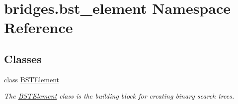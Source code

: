 \hypertarget{namespacebridges_1_1bst__element}{}\section{bridges.\+bst\+\_\+element Namespace Reference}
\label{namespacebridges_1_1bst__element}
\subsection*{Classes}
\begin{DoxyCompactItemize}
\item 
class \hyperlink{classbridges_1_1bst__element_1_1_b_s_t_element}{B\+S\+T\+Element}
\begin{DoxyCompactList}\small\item\em The \hyperlink{classbridges_1_1bst__element_1_1_b_s_t_element}{B\+S\+T\+Element} class is the building block for creating binary search trees. \end{DoxyCompactList}\end{DoxyCompactItemize}
